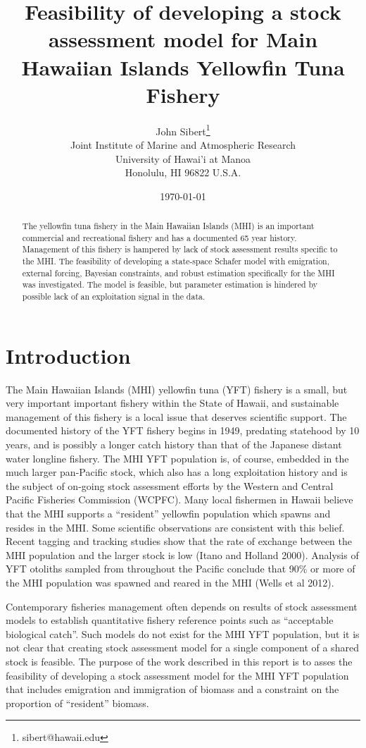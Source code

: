 \documentclass[12pt,letterpaper,twoside]{article}
\title{Feasibility of developing a stock assessment model for Main Hawaiian Islands Yellowfin Tuna
Fishery}
\author{
John Sibert\thanks{sibert@hawaii.edu}\\
Joint Institute of Marine and Atmospheric Research\\
University of Hawai'i at Manoa\\
Honolulu, HI  96822 U.S.A.\\[0.125in]
\date{\today}
}
\newcommand\doublespacing{\baselineskip=1.6\normalbaselineskip}
\begin{document}
\maketitle


\begin{abstract}
The yellowfin tuna fishery in the Main Hawaiian Islands (MHI)
is an important commercial and recreational fishery and
has a documented 65 year history. Management of this fishery is
hampered by lack of stock assessment results specific to the MHI. The
feasibility of developing a state-space Schafer model with emigration,
external forcing, Bayesian constraints, and robust estimation
specifically for the MHI was investigated. The model is feasible, but
parameter estimation is hindered by possible lack of an exploitation
signal in the data.
\end{abstract}

\section{Introduction}
The Main Hawaiian Islands (MHI) yellowfin tuna (YFT) fishery is 
a small, but very important important fishery within the State of
Hawaii, and sustainable management of this
fishery is a local issue that deserves scientific support.
The documented history of the YFT fishery begins in
1949, predating statehood by 10 years, and is possibly a longer catch
history than that of the Japanese distant water longline fishery.
The MHI YFT population is, of course,
embedded in the much larger pan-Pacific stock, which also has a long
exploitation history and is the subject of on-going stock assessment
efforts by the Western and Central Pacific Fisheries Commission (WCPFC).
Many local fishermen in Hawaii
believe that the MHI supports a ``resident'' yellowfin population
which spawns and resides in the MHI.
Some scientific observations are consistent with this belief. 
Recent tagging and tracking
studies show that the rate of exchange between the MHI population
and the larger stock is low (Itano and Holland 2000). 
Analysis of YFT otoliths sampled from
throughout the Pacific conclude that 90\% or more of the MHI
population was spawned and reared in the MHI (Wells et al 2012).

Contemporary fisheries management often depends on results of stock
assessment models to establish quantitative fishery reference points
such as ``acceptable biological catch''.
Such models do not exist for the MHI YFT population, but
it is not clear that creating stock assessment model
for a single component of a shared stock is feasible.
The purpose of the work described in this report is to asses the
feasibility of developing a stock assessment model for the MHI YFT
population that includes emigration and immigration of biomass and a
constraint on the proportion of ``resident'' biomass.
\end{document}
